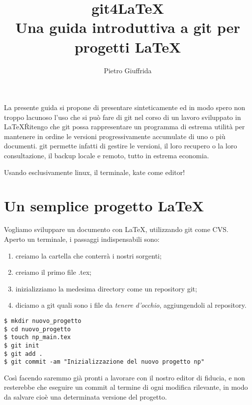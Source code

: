 \documentclass{article}
\begin{document}
\lstset{
  frame=single,
  breaklines = true, %
  breakautoindent = true, %
  breakindent = 90pt, %
}
\title{git4\LaTeX \\
  Una guida introduttiva a git per progetti \LaTeX}
\author{Pietro Giuffrida}
\maketitle

La presente guida si propone di presentare sinteticamente ed in modo spero non
troppo lacunoso l'uso che si può fare di git nel corso di un lavoro sviluppato
in \LaTeX\. Ritengo che git possa rappresentare un programma di estrema utilità
per mantenere in ordine le versioni progressivamente accumulate di uno o più
documenti. git permette infatti di gestire le versioni, il loro recupero o la
loro consultazione, il backup locale e remoto, tutto in estrema economia.

Usando esclusivamente linux, il terminale, kate come editor!

\tableofcontents

\section{Un semplice progetto \LaTeX}
Vogliamo sviluppare un documento con \LaTeX, utilizzando git come CVS.
Aperto un terminale, i passaggi indispensabili sono:
\begin{enumerate}
\item creiamo la cartella che conterrà i nostri sorgenti;
\item creiamo il primo file .tex;
\item inizializziamo la medesima directory come un repository git;
\item diciamo a git quali sono i file da \textit{tenere d'occhio},
aggiungendoli al repository.
\end{enumerate}

\begin{lstlisting}
$ mkdir nuovo_progetto
$ cd nuovo_progetto
$ touch np_main.tex
$ git init
$ git add .
$ git commit -am "Inizializzazione del nuovo progetto np"
\end{lstlisting}

Così facendo saremmo già pronti a lavorare con il nostro editor di fiducia, e
non resterebbe che eseguire un commit al termine di ogni modifica rilevante, in
modo da salvare cioè una determinata versione del progetto.
\end{document}
